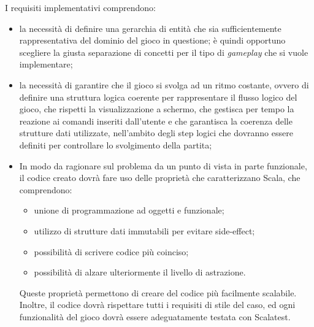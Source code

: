 I requisiti implementativi comprendono:
\begin{itemize}
    \item la necessità di definire una gerarchia di entità che sia sufficientemente rappresentativa del dominio del gioco in questione; è quindi opportuno scegliere la giusta separazione di concetti per il tipo di \textit{gameplay} che si vuole implementare;
    \item la necessità di garantire che il gioco si svolga ad un ritmo costante, ovvero di definire una struttura logica coerente per rappresentare il flusso logico del gioco, che rispetti la visualizzazione a schermo, che gestisca per tempo la reazione ai comandi inseriti dall'utente e che garantisca la coerenza delle strutture dati utilizzate, nell'ambito degli step logici che dovranno essere definiti per controllare lo svolgimento della partita;
    \item In modo da ragionare sul problema da un punto di vista in parte funzionale, il codice creato dovrà fare uso delle proprietà che caratterizzano Scala, che comprendono:
    \begin{itemize}
	    \item unione di programmazione ad oggetti e funzionale;
	    \item utilizzo di strutture dati immutabili per evitare side-effect;
	    \item possibilità di scrivere codice più coinciso;
	    \item possibilità di alzare ulteriormente il livello di astrazione.
    \end{itemize}
    Queste proprietà permettono di creare del codice più facilmente scalabile. Inoltre, il codice dovrà rispettare tutti i requisiti di stile del caso, ed ogni funzionalità del gioco dovrà essere adeguatamente testata con Scalatest.
\end{itemize}